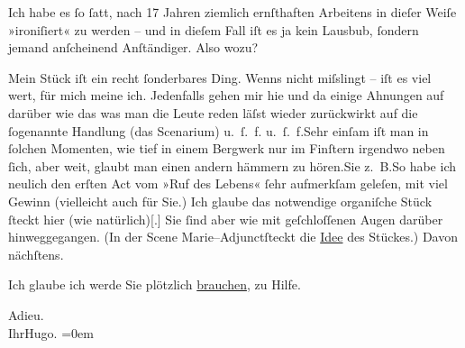 \pstart
           Ich habe es ſo ſatt, nach 17 Jahren ziemlich ernſthaften Arbeitens in dieſer Weiſe
               »ironiſiert« zu werden – und in dieſem Fall iſt es ja kein Lausbub, ſondern jemand anſcheinend
               Anſtändiger. Also wozu?\pend
           
\pstart
           {\pb}Mein Stück iſt ein recht ſonderbares Ding. Wenns
               nicht miſslingt – iſt es viel wert, für mich meine ich. Jedenfalls gehen mir hie und
               da einige Ahnungen auf darüber wie das was man die Leute reden läſst wieder
               zurückwirkt auf die ſogenannte Handlung (das Scenarium) u. ſ. f. u. ſ. f.\hspace*{1.5em}Sehr einſam iſt man in ſolchen Momenten, wie tief in
               einem Bergwerk nur im Finſtern {\pb}irgendwo neben ſich, aber weit, glaubt man einen andern hämmern zu hören.\hspace*{1.5em}Sie z. B.\hspace*{1.5em}So habe ich
               neulich den erſten Act vom »Ruf des Lebens« ſehr
               aufmerkſam geleſen, mit viel Gewinn (vielleicht auch für Sie.) Ich glaube das
               notwendige organiſche Stück ſteckt hier (wie natürlich){[}.{]} Sie
               ſind aber wie mit geſchloſſenen Augen darüber hinweggegangen. (In der Scene Marie–Adjunctſteckt die \uline{Idee} des
               Stückes.) Davon nächſtens.\pend
           
\pstart
           Ich glaube ich werde Sie plötzlich \uline{brauchen}, zu
               Hilfe.\pend
           
\pstart
           Adieu.{\\[\baselineskip]}Ihr\spacefill\mbox{Hugo.}\pend
           \leftskip=0em{}
\pstart
           \noindent{}\label{T_L01727-1v}\label{T_L01727-1}\pend
           \endnumbering{}  
      